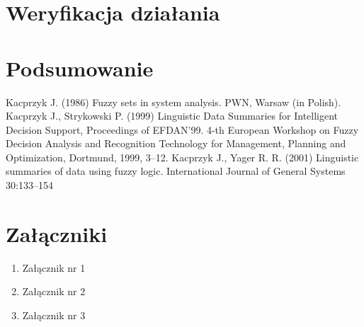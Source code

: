\documentclass[12pt]{report}
\begin{document}
\chapter{Weryfikacja działania}
\chapter{Podsumowanie}
\begin{thebibliography}{99}
Kacprzyk J. (1986) Fuzzy sets in system analysis.  PWN, Warsaw (in Polish).
Kacprzyk J., Strykowski P. (1999) Linguistic Data Summaries for Intelligent Decision Support, Proceedings of EFDAN'99. 4-th European Workshop on Fuzzy Decision Analysis and Recognition Technology for Management, Planning and Optimization, Dortmund, 1999, 3--12.
Kacprzyk J., Yager R. R. (2001) Linguistic summaries of data using fuzzy logic. International Journal of General Systems 30:133--154 

\end{thebibliography}

\listoffigures

\listoftables


\chapter*{Załączniki}
\begin{enumerate}
\item Załącznik nr 1
\item Załącznik nr 2
\item Załącznik nr 3
\end{enumerate}
\end{document}
